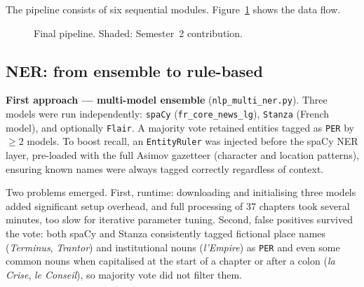 \documentclass[a4paper]{article}
\begin{document}
The pipeline consists of six sequential modules.
Figure~\ref{fig:pipeline} shows the data flow.


\begin{figure}[t]
\centering
{}
\caption{Final pipeline. Shaded: Semester~2 contribution.}
\label{fig:pipeline}
\end{figure}

\subsection{NER: from ensemble to rule-based}

\textbf{First approach --- multi-model ensemble} (\texttt{nlp\_multi\_ner.py}).
Three models were run independently: \texttt{spaCy} (\texttt{fr\_core\_news\_lg}),
\texttt{Stanza} (French model), and optionally \texttt{Flair}. A majority vote retained entities tagged as \texttt{PER} by
$\geq 2$ models. To boost recall, an \texttt{EntityRuler} was injected
before the spaCy NER layer, pre-loaded with the full Asimov gazetteer
(character and location patterns), ensuring known names were always
tagged correctly regardless of context.

Two problems emerged. First, runtime: downloading and initialising three
models added significant setup overhead, and full processing of 37 chapters
took several minutes, too slow for iterative parameter tuning. Second,
false positives survived the vote: both spaCy and Stanza consistently tagged
fictional place names (\textit{Terminus}, \textit{Trantor}) and institutional
nouns (\textit{l'Empire}) as \texttt{PER} and even some common nouns when capitalised at the start of a chapter or after a colon
(\textit{la Crise}, \textit{le Conseil}), so majority vote did not filter them.
\end{document}
